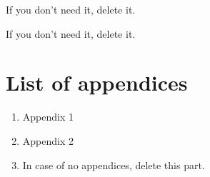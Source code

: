 \documentclass[a4paper,11pt,twoside]{report}
\theoremstyle{definition}
\begin{document}
\listoffigures
\thispagestyle{empty}
If you don't need it, delete it.


\renewcommand{\listtablename}{Spis tabel}
\listoftables
\thispagestyle{empty}
If you don't need it, delete it.

\chapter*{List of appendices}
\begin{enumerate}
    \item Appendix 1
    \item Appendix 2
    \item In case of no appendices, delete this part.
\end{enumerate}
\thispagestyle{empty}
\end{document}
